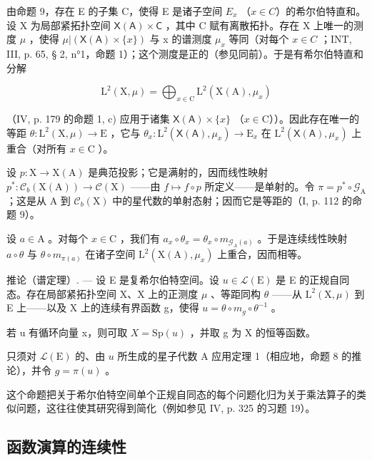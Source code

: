 由命题 9，存在 E 的子集 C，使得 E 是诸子空间 \(E_{x}\) （\(x \in C\)）的希尔伯特直和。设 X 为局部紧拓扑空间 \(\mathsf{X}(\mathsf{A}) \times \mathsf{C}\) ，其中 C 赋有离散拓扑。存在 X 上唯一的测度 \(\mu\) ，使得 \(\mu|(\mathsf{X}(\mathsf{A}) \times \{x\})\) 与 x 的谱测度 \(\mu_{x}\) 等同（对每个 \(x \in C\) ；INT, III, p. 65, § 2, n°1，命题 1）；这个测度是正的（参见同前）。于是有希尔伯特直和分解

\[
\mathrm{L} ^ {2} (\mathrm{X}, \mu) = \bigoplus_ {x \in \mathrm{C}} \mathrm{L} ^ {2} (\mathrm{X} (\mathrm{A}), \mu_ {x})
\]

（IV, p. 179 的命题 1, c) 应用于诸集 \(\mathsf{X}(\mathsf{A}) \times \{x\}\) （\(x \in \mathrm{C}\)））。因此存在唯一的等距 \(\theta: \mathrm{L}^2(\mathrm{X}, \mu) \to \mathrm{E}\) ，它与 \(\theta_x: \mathrm{L}^2(\mathsf{X}(\mathsf{A}), \mu_x) \to \mathrm{E}_x\) 在 \(\mathrm{L}^2(\mathsf{X}(\mathsf{A}), \mu_x)\) 上重合（对所有 \(x \in \mathrm{C}\) ）。

设 \(p \colon \mathrm{X} \to \mathrm{X}(\mathrm{A})\) 是典范投影；它是满射的，因而线性映射 \(p^* \colon \mathcal{C}_b(\mathrm{X}(\mathrm{A})) \to \mathcal{C}(\mathrm{X})\) ——由 \(f \mapsto f \circ p\) 所定义——是单射的。令 \(\pi = p^* \circ \mathcal{G}_{\mathrm{A}}\) ；这是从 A 到 \(\mathcal{C}_b(\mathrm{X})\) 中的星代数的单射态射；因而它是等距的（I, p. 112 的命题 9）。

设 \(a \in \mathrm{A}\) 。对每个 \(x \in \mathrm{C}\) ，我们有 \(a_x \circ \theta_x = \theta_x \circ m_{\mathcal{G}_A(a)}\) 。于是连续线性映射 \(a \circ \theta\) 与 \(\theta \circ m_{\pi(a)}\) 在诸子空间 \(\mathrm{L}^2(\mathrm{X}(\mathrm{A}), \mu_x)\) 上重合，因而相等。

推论（谱定理）. --- 设 E 是复希尔伯特空间。设 \(u \in \mathcal{L}(\mathrm{E})\) 是 E 的正规自同态。存在局部紧拓扑空间 X、X 上的正测度 \(\mu\) 、等距同构 \(\theta\) ——从 \(\mathrm{L}^{2}(\mathrm{X},\mu)\) 到 E 上——以及 X 上的连续有界函数 g，使得 \(u = \theta \circ m_{g} \circ \theta^{-1}\) 。

若 u 有循环向量 x，则可取 \(X = \mathrm{Sp}(u)\) ，并取 g 为 X 的恒等函数。

只须对 \(\mathcal{L}(\mathrm{E})\) 的、由 \(u\) 所生成的星子代数 A 应用定理 1（相应地，命题 8 的推论），并令 \(g = \pi(u)\) 。

这个命题把关于希尔伯特空间单个正规自同态的每个问题化归为关于乘法算子的类似问题，这往往使其研究得到简化（例如参见 IV, p. 325 的习题 19）。

\subsection{函数演算的连续性}

